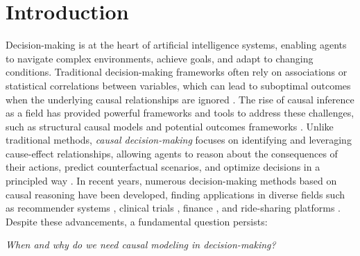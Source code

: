 \section{Introduction}%

Decision-making is at the heart of artificial intelligence systems, enabling agents to navigate complex environments, achieve goals, and adapt to changing conditions. Traditional decision-making frameworks often rely on associations or statistical correlations between variables, which can lead to suboptimal outcomes when the underlying causal relationships are ignored \citep{pearl2009causal}. 
The rise of causal inference as a field has provided powerful frameworks and tools to address these challenges, such as structural causal models and potential outcomes frameworks \citep{rubin1978bayesian,pearl2000causality}. 
Unlike traditional methods, \textit{causal decision-making} focuses on identifying and leveraging cause-effect relationships, allowing agents to reason about the consequences of their actions, predict counterfactual scenarios, and optimize decisions in a principled way \citep{spirtes2000causation}. In recent years, numerous decision-making methods based on causal reasoning have been developed, finding applications in diverse fields such as recommender systems \citep{zhou2017large}, clinical trials \citep{durand2018contextual}, finance \citep{bai2024review}, and ride-sharing platforms \citep{wan2021pattern}. Despite these advancements, a fundamental question persists: 

\begin{center}
    \textit{When and why do we need causal modeling in decision-making?}
\end{center} 



 


